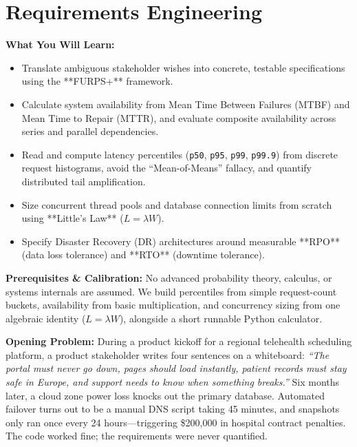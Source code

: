 \chapter{Requirements Engineering}
\label{chap:requirements}

\begin{chaptergoalsbox}
\textbf{What You Will Learn:}
\begin{itemize}[leftmargin=12pt]
  \item Translate ambiguous stakeholder wishes into concrete, testable specifications using the **FURPS+** framework.
  \item Calculate system availability from Mean Time Between Failures (MTBF) and Mean Time to Repair (MTTR), and evaluate composite availability across series and parallel dependencies.
  \item Read and compute latency percentiles (\texttt{p50}, \texttt{p95}, \texttt{p99}, \texttt{p99.9}) from discrete request histograms, avoid the ``Mean-of-Means'' fallacy, and quantify distributed tail amplification.
  \item Size concurrent thread pools and database connection limits from scratch using **Little's Law** ($L = \lambda W$).
  \item Specify Disaster Recovery (DR) architectures around measurable **RPO** (data loss tolerance) and **RTO** (downtime tolerance).
\end{itemize}

\textbf{Prerequisites \& Calibration:}
No advanced probability theory, calculus, or systems internals are assumed. We build percentiles from simple request-count buckets, availability from basic multiplication, and concurrency sizing from one algebraic identity ($L = \lambda W$), alongside a short runnable Python calculator.

\textbf{Opening Problem:}
During a product kickoff for a regional telehealth scheduling platform, a product stakeholder writes four sentences on a whiteboard: \textit{``The portal must never go down, pages should load instantly, patient records must stay safe in Europe, and support needs to know when something breaks.''} Six months later, a cloud zone power loss knocks out the primary database. Automated failover turns out to be a manual DNS script taking 45 minutes, and snapshots only ran once every 24 hours---triggering \$200,000 in hospital contract penalties. The code worked fine; the requirements were never quantified.
\end{chaptergoalsbox}

